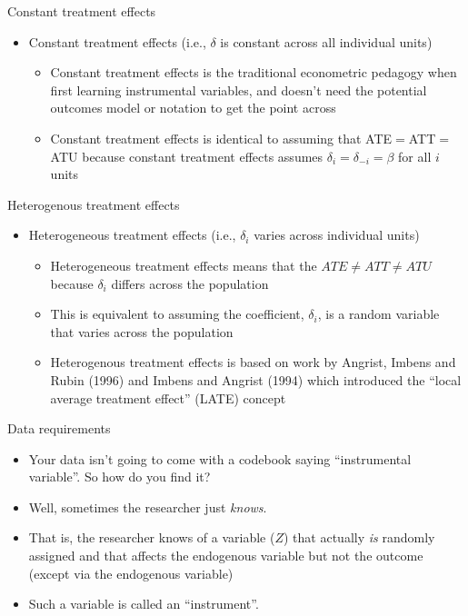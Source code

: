 \documentclass{beamer}
\begin{document}
\begin{frame}{Constant treatment effects}

		\begin{itemize}
		\item Constant treatment effects (i.e., $\delta$ is constant across all individual units)
			\begin{itemize}
			\item Constant treatment effects is the traditional econometric pedagogy when first learning instrumental variables, and doesn't need the potential outcomes model or notation to get the point across
			\item Constant treatment effects is identical to assuming that ATE$=$ATT$=$ATU because constant treatment effects assumes $\delta_i=\delta_{-i}=\beta$ for all $i$ units
			\end{itemize}
		\end{itemize}

\end{frame}


\begin{frame}{Heterogenous treatment effects}

\begin{itemize}
		\item Heterogeneous treatment effects (i.e., $\delta_i$ varies across individual units)
			\begin{itemize}
			\item Heterogeneous treatment effects means that the $ATE\neq{ATT}\neq{ATU}$ because $\delta_i$ differs across the population
			\item This is equivalent to assuming the coefficient, $\delta_i$, is a random variable that varies across the population
			\item Heterogenous treatment effects is based on work by Angrist, Imbens and Rubin (1996) and Imbens and Angrist (1994) which introduced the  ``local average treatment effect'' (LATE) concept
			\end{itemize}
\end{itemize}

\end{frame}

\begin{frame}{Data requirements}

	\begin{itemize}
	\item Your data isn't going to come with a codebook saying ``instrumental variable''.  So how do you find it?
	\item Well, sometimes the researcher just \emph{knows}.  
	\item That is, the researcher knows of a variable ($Z$) that actually \emph{is} randomly assigned and that affects the endogenous variable but not the outcome (except via the endogenous variable)  
	\item Such a variable is called an ``instrument''.
	\end{itemize}
\end{frame}
\end{document}
